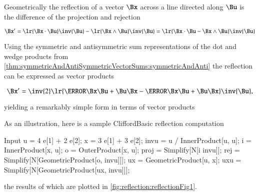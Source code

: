 %
%

Geometrically the reflection of a vector \( \Bx \) across a line directed along \( \Bu \) is the difference of the projection and rejection

\begin{dmath}\label{eqn:reflection:900}
\Bx'
= \lr{ \Bx \cdot \Bu } \inv{\Bu} - \lr{ \Bx \wedge \Bu } \inv{\Bu }
= \lr{ \Bx \cdot \Bu - \Bx \wedge \Bu } \inv{\Bu }
\end{dmath}

Using the symmetric and antisymmetric sum representations of the dot and wedge products from
\cref{thm:symmetricAndAntiSymmetricVectorSums:symmetricAndAnti}
the reflection can be expressed as vector products

\begin{dmath}\label{eqn:reflection:940}
\Bx'
= \inv{2} \lr{ \cancel{\Bx \Bu} + \Bu \Bx - \cancel{\Bx \Bu} + \Bu \Bx } \inv{\Bu },
\end{dmath}

yielding a remarkably simple form in terms of vector products


As an illustration, here is a sample CliffordBasic reflection computation

\begin{mmaCell}[moredefined={u, e, x, uu, InnerProduct, invu, i, o, OuterProduct, proj, rej, GeometricProduct, ux, uxu}]{Input}
u = 4 e[1] + 2 e[2]; x = 3 e[1] + 3 e[2];
invu = u / InnerProduct[u, u];
i = InnerProduct[x, u]; o = OuterProduct[x, u];
proj = Simplify[N[i invu]];
rej = Simplify[N[GeometricProduct[o, invu]]];
ux = GeometricProduct[u, x];
uxu = Simplify[N[GeometricProduct[ux, invu]]];
\end{mmaCell}

the results of which are plotted in \cref{fig:reflection:reflectionFig1}.

